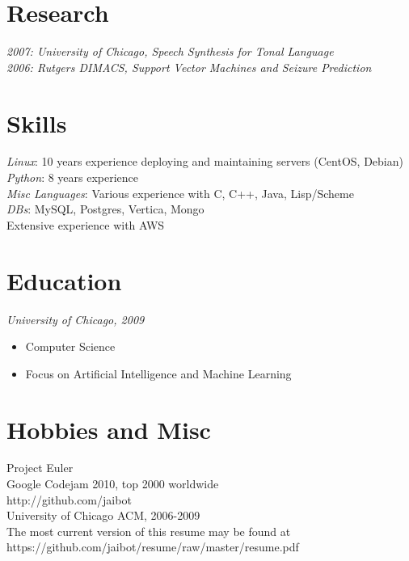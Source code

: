 \documentclass[11pt]{res} %
\begin{document}
\begin{resume}
\section{Research}
{\sl 2007: University of Chicago, Speech Synthesis for Tonal Language} \\
{\sl 2006: Rutgers DIMACS, Support Vector Machines and Seizure Prediction}

\section{Skills}
{\sl Linux}: 10 years experience deploying and maintaining servers (CentOS, Debian)\\
{\sl Python}: 8 years experience \\
{\sl Misc Languages}: Various experience with C, C++, Java, Lisp/Scheme \\
{\sl DBs}: MySQL, Postgres, Vertica, Mongo \\
Extensive experience with AWS


\section{Education}

{\sl University of Chicago, 2009}
\begin{itemize}
    \item Computer Science
    \item Focus on Artificial Intelligence and Machine Learning
\end{itemize}
 

\section{Hobbies and Misc} 

{Project Euler} \\
{Google Codejam 2010, top 2000 worldwide} \\
{http://github.com/jaibot } \\
{University of Chicago ACM, 2006-2009} \\

\hspace{-30mm}
The most current version of this resume may be found at https://github.com/jaibot/resume/raw/master/resume.pdf
\end{resume}
\end{document}
